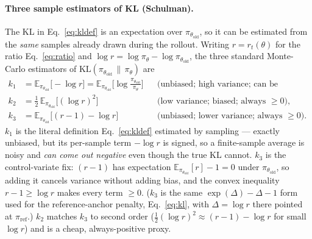 \documentclass[11pt]{article}
\newcommand{\E}{\mathbb{E}}
\newcommand{\KL}{\mathrm{KL}}
\newcommand{\pol}{\pi_\theta}
\newcommand{\polold}{\pi_{\theta_{\mathrm{old}}}}
\newcommand{\polref}{\pi_{\mathrm{ref}}}
\begin{document}
\paragraph{Three sample estimators of KL (Schulman).} The KL in Eq.~\eqref{eq:kldef} is an expectation
over $\polold$, so it can be estimated from the \emph{same} samples already drawn during the rollout.
Writing $r=r_t(\theta)$ for the ratio Eq.~\eqref{eq:ratio} and $\log r=\log\pol-\log\polold$, the three
standard Monte-Carlo estimators of $\KL(\polold\,\|\,\pol)$ are
\begin{align}
k_1 &= \E_{\polold}\!\big[-\log r\big] = \E_{\polold}\!\big[\log\tfrac{\polold}{\pol}\big]
   && \text{(unbiased; high variance; can be negative),}\label{eq:k1}\\
k_2 &= \tfrac12\,\E_{\polold}\!\big[(\log r)^2\big]
   && \text{(low variance; biased; always }\ge 0\text{),}\label{eq:k2}\\
k_3 &= \E_{\polold}\!\big[(r-1) - \log r\big]
   && \text{(unbiased; lower variance; always }\ge 0\text{).}\label{eq:k3}
\end{align}
$k_1$ is the literal definition Eq.~\eqref{eq:kldef} estimated by sampling --- exactly unbiased, but its
per-sample term $-\log r$ is signed, so a finite-sample average is noisy and \emph{can come out
negative} even though the true KL cannot. $k_3$ is the control-variate fix: $(r-1)$ has expectation
$\E_{\polold}[r]-1=0$ under $\polold$, so adding it cancels variance without adding bias, and the convex
inequality $r-1\ge\log r$ makes every term $\ge 0$. ($k_3$ is the same $\exp(\Delta)-\Delta-1$ form used
for the reference-anchor penalty, Eq.~\eqref{eq:kl}, with $\Delta=\log r$ there pointed at $\polref$.)
$k_2$ matches $k_3$ to second order ($\tfrac12(\log r)^2\approx(r-1)-\log r$ for small $\log r$) and is a
cheap, always-positive proxy.
\end{document}

